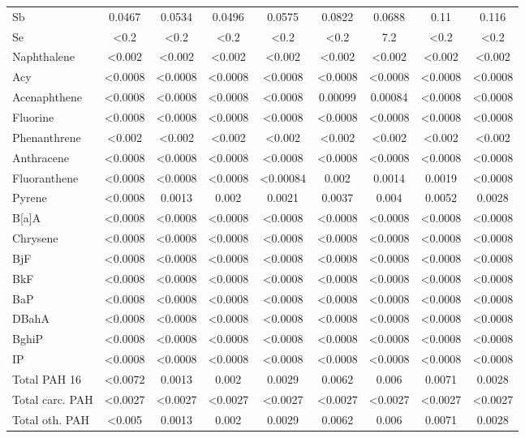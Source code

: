 \documentclass[algorithms,article,submit,pdftex,moreauthors]{Definitions/mdpi}
\begin{document}
\begin{scriptsize}
\begin{center}
\begin{longtable}{@{\extracolsep{\fill}}|p{1.8cm}|cccccccc|@{}}
Sb & 0.0467 & 0.0534 & 0.0496 & 0.0575 & 0.0822 & 0.0688 & 0.11 & 0.116  \\
Se & <0.2 & <0.2 & <0.2 & <0.2 & <0.2 & 7.2 & <0.2 & <0.2  \\
Naphthalene & <0.002 & <0.002 & <0.002 & <0.002 & <0.002 & <0.002 & <0.002 & <0.002 \\
Acy & <0.0008 & <0.0008 & <0.0008 & <0.0008 & <0.0008 & <0.0008 & <0.0008 & <0.0008  \\
Acenaphthene & <0.0008 & <0.0008 & <0.0008 & <0.0008 & 0.00099 & 0.00084 & <0.0008 & <0.0008  \\
Fluorine & <0.0008 & <0.0008 & <0.0008 & <0.0008 & <0.0008 & <0.0008 & <0.0008 & <0.0008  \\
Phenanthrene & <0.002 & <0.002 & <0.002 & <0.002 & <0.002 & <0.002 & <0.002 & <0.002  \\
Anthracene & <0.0008 & <0.0008 & <0.0008 & <0.0008 & <0.0008 & <0.0008 & <0.0008 & <0.0008  \\
Fluoranthene & <0.0008 & <0.0008 & <0.0008 & <0.00084 & 0.002 & 0.0014 & 0.0019 & <0.0008  \\
Pyrene & <0.0008 & 0.0013 & 0.002 & 0.0021 & 0.0037 & 0.004 & 0.0052 & 0.0028  \\
B[a]A & <0.0008 & <0.0008 & <0.0008 & <0.0008 & <0.0008 & <0.0008 & <0.0008 & <0.0008  \\
Chrysene & <0.0008 & <0.0008 & <0.0008 & <0.0008 & <0.0008 & <0.0008 & <0.0008 & <0.0008  \\
BjF  & <0.0008 & <0.0008 & <0.0008 & <0.0008 & <0.0008 & <0.0008 & <0.0008 & <0.0008  \\
BkF & <0.0008 & <0.0008 & <0.0008 & <0.0008 & <0.0008 & <0.0008 & <0.0008 & <0.0008  \\
BaP & <0.0008 & <0.0008 & <0.0008 & <0.0008 & <0.0008 & <0.0008 & <0.0008 & <0.0008  \\
DBahA & <0.0008 & <0.0008 & <0.0008 & <0.0008 & <0.0008 & <0.0008 & <0.0008 & <0.0008  \\
BghiP & <0.0008 & <0.0008 & <0.0008 & <0.0008 & <0.0008 & <0.0008 & <0.0008 & <0.0008  \\
IP & <0.0008 & <0.0008 & <0.0008 & <0.0008 & <0.0008 & <0.0008 & <0.0008 & <0.0008  \\
Total PAH 16 & <0.0072 & 0.0013 & 0.002 & 0.0029 & 0.0062 & 0.006 & 0.0071 & 0.0028  \\
Total carc. PAH & <0.0027 & <0.0027 & <0.0027 & <0.0027 & <0.0027 & <0.0027 & <0.0027 & <0.0027  \\
Total oth. PAH & <0.005 & 0.0013 & 0.002 & 0.0029 & 0.0062 & 0.006 & 0.0071 & 0.0028  \\

\end{longtable}
\end{center}
\end{scriptsize}
\end{document}
